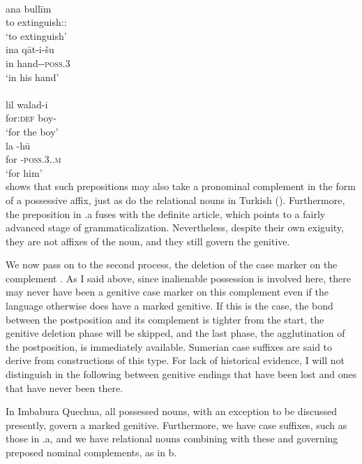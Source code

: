 \ea\label{ex:E54}
\langinfo{\LangAccad}{}{}\\
 \ea
 \gll  ana  bull\=im  \\
   to  extinguish:\glinf:\glgen  \\
\glt  ‘to extinguish’\\
\ex
\gll  ina  q\=at-i-šu  \\
 in  hand-\glgen-\textsc{poss}.3 \\
 \glt ‘in his hand’\\
\z
\z
\noindent \ea\label{ex:E55}
\\
 \ea
 \gll lil  walad-i  \\
   for:\textsc{def}  boy-\glgen\\ 
   \glt ‘for the boy’\\
\ex
\gll  la  {}-h\=u  \\
 for  {}-\textsc{poss}.3.\glsg.\textsc{m} \\
 \glt ‘for him’\\
\z
\z
\noindent {} shows that such prepositions may also take a pronominal complement in the form of a possessive affix, just as do the relational nouns in Turkish (). Furthermore, the preposition in .a fuses with the definite article, which points to a fairly advanced stage of grammaticalization. Nevertheless, despite their own exiguity, they are not affixes of the noun, and they still govern the genitive.

We now pass on to the second process, the deletion of the case marker on the complement \np. As I said above, since inalienable possession is involved here, there may never have been a genitive case marker on this complement even if the language otherwise does have a marked genitive. If this is the case, the bond between the postposition and its complement is tighter from the start, the genitive deletion phase will be skipped, and the last phase, the agglutination of the postposition, is immediately available. Sumerian case suffixes are said to derive from constructions of this type. For lack of historical evidence, I will not distinguish in the following between genitive endings that have been lost and ones that have never been there.

\label{page87}In Imbabura Quechua, all possessed nouns, with an exception to be discussed presently, govern a marked genitive. Furthermore, we have case suffixes, such as those in .a, and we have relational nouns combining with these and governing preposed nominal complements, as in b.


